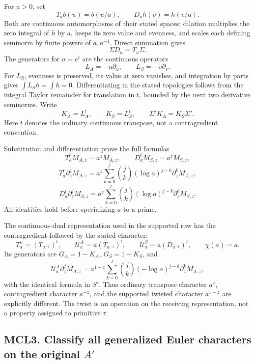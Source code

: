 For \(a>0\), set \[
 T_ab(u)=b(u/a),\qquad D_ah(v)=h(v/a).
\] Both are continuous automorphisms of their stated spaces; dilation
multiplies the zero integral of \(h\) by \(a\), keeps its zero value and
evenness, and scales each defining seminorm by finite powers of
\(a,a^{-1}\). Direct summation gives \[
 \Sigma D_a=T_a\Sigma.
 \tag{MCL2.1}
\] The generators for \(a=e^t\) are the continuous operators \[
 L_A=-u\partial_u,\qquad L_S=-v\partial_v .
\] For \(L_S\), evenness is preserved, its value at zero vanishes, and
integration by parts gives \(\int L_Sh=\int h=0\). Differentiating in
the stated topologies follows from the integral Taylor remainder for
translation in \(t\), bounded by the next two derivative seminorms.
Write \[
 K_A=L_A^t,\qquad K_S=L_S^t,\qquad
 \Sigma'K_A=K_S\Sigma'.
 \tag{MCL2.2}
\] Here \(t\) denotes the ordinary continuous transpose, not a
contragredient convention.

Substitution and differentiation prove the full formulas \[
 T_a^tM_{A,z}=a^zM_{A,z},\qquad
 D_a^tM_{S,z}=a^zM_{S,z},
\] \[
 T_a^t\partial_z^jM_{A,z}
 =a^z\sum_{k=0}^j\binom jk(\log a)^{j-k}
       \partial_z^kM_{A,z},
\] \[
 D_a^t\partial_z^jM_{S,z}
 =a^z\sum_{k=0}^j\binom jk(\log a)^{j-k}
       \partial_z^kM_{S,z}.
 \tag{MCL2.3}
\] All identities hold before specializing \(a\) to a prime.

The continuous-dual representation used in the supported row has the
contragredient followed by the stated character: \[
 T_a^\vee=(T_{a^{-1}})^t,\qquad
 \mathcal U_a^A=a(T_{a^{-1}})^t,\qquad
 \mathcal U_a^S=a(D_{a^{-1}})^t,\qquad \chi(a)=a.
\] Its generators are \(G_A=1-K_A\), \(G_S=1-K_S\), and \[
 \mathcal U_a^A\partial_z^jM_{A,z}
 =a^{1-z}\sum_{k=0}^j\binom jk(-\log a)^{j-k}
       \partial_z^kM_{A,z},
 \tag{MCL2.4}
\] with the identical formula in \(S'\). Thus ordinary transpose
character \(a^z\), contragredient character \(a^{-z}\), and the
supported twisted character \(a^{1-z}\) are explicitly different. The
twist is an operation on the receiving representation, not a property
assigned to primitive \(\tau\).

\subsection{\texorpdfstring{MCL3. Classify all generalized Euler
characters on the original
\(A'\)}{MCL3. Classify all generalized Euler characters on the original A\textquotesingle{}}}\label{mcl3.-classify-all-generalized-euler-characters-on-the-original-a}


